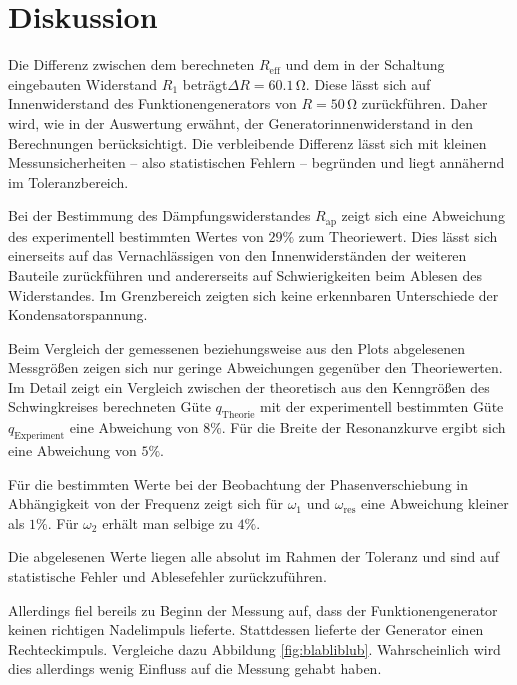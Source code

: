\section{Diskussion}
\label{sec:Diskussion}
Die Differenz zwischen dem berechneten $R_\text{eff}$ und dem in der Schaltung eingebauten Widerstand $R_\text{1}$ beträgt$\Delta R=60.1 \,\si{\ohm}$.
Diese lässt sich auf Innenwiderstand des Funktionengenerators von $R=50\,\si{\ohm}$ zurückführen.
Daher wird, wie in der Auswertung erwähnt, der Generatorinnenwiderstand in den Berechnungen berücksichtigt.
Die verbleibende Differenz lässt sich mit kleinen Messunsicherheiten -- also statistischen Fehlern -- begründen und liegt annähernd im Toleranzbereich.

Bei der Bestimmung des Dämpfungswiderstandes $R_{\mathrm{ap}}$ zeigt sich eine Abweichung 
des experimentell bestimmten Wertes von $29\%$ zum Theoriewert. Dies lässt sich einerseits 
auf das Vernachlässigen von den Innenwiderständen der weiteren Bauteile zurückführen und 
andererseits auf Schwierigkeiten beim Ablesen des Widerstandes. Im Grenzbereich zeigten 
sich keine erkennbaren Unterschiede der Kondensatorspannung. 

Beim Vergleich der gemessenen beziehungsweise aus den Plots abgelesenen Messgrößen zeigen sich nur geringe Abweichungen gegenüber den Theoriewerten.
Im Detail zeigt ein Vergleich zwischen der theoretisch aus den Kenngrößen des Schwingkreises berechneten Güte $q_\mathrm{Theorie}$ mit der experimentell bestimmten Güte $q_\mathrm{Experiment}$ eine Abweichung von $8\%$.
Für die Breite der Resonanzkurve ergibt sich eine Abweichung von $5\%$.

Für die bestimmten Werte bei der Beobachtung der Phasenverschiebung in Abhängigkeit von der 
Frequenz zeigt sich für $\omega_1$ und $\omega_{\mathrm{res}}$ eine Abweichung kleiner als $1\%$. Für $\omega_2$ erhält man selbige zu $4\%$.

Die abgelesenen Werte liegen alle absolut im Rahmen der Toleranz und sind auf statistische Fehler 
und Ablesefehler zurückzuführen.

Allerdings fiel bereils zu Beginn der Messung auf, dass der Funktionengenerator keinen richtigen Nadelimpuls lieferte. Stattdessen lieferte der Generator einen Rechteckimpuls. Vergleiche dazu Abbildung \ref{fig:blabliblub}.
Wahrscheinlich wird dies allerdings wenig Einfluss auf die Messung gehabt haben.

